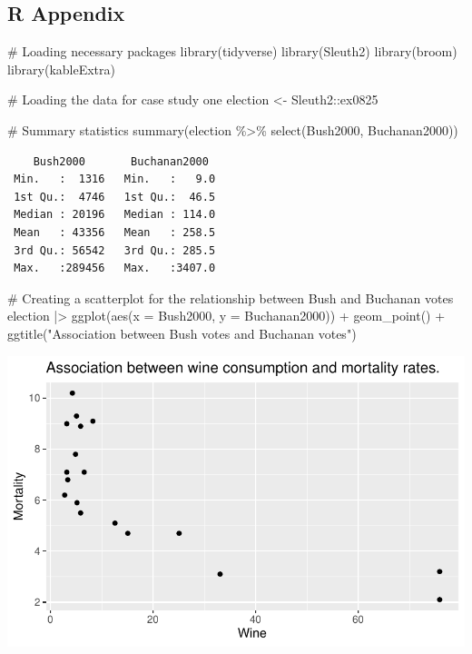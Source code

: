 \documentclass[
  letterpaper,
  DIV=11,
  numbers=noendperiod]{scrartcl}
\newenvironment{Shaded}{\begin{snugshade}}{\end{snugshade}}
\newcommand{\AttributeTok}[1]{\textcolor[rgb]{0.40,0.45,0.13}{#1}}
\newcommand{\CommentTok}[1]{\textcolor[rgb]{0.37,0.37,0.37}{#1}}
\newcommand{\FunctionTok}[1]{\textcolor[rgb]{0.28,0.35,0.67}{#1}}
\newcommand{\NormalTok}[1]{\textcolor[rgb]{0.00,0.23,0.31}{#1}}
\newcommand{\OtherTok}[1]{\textcolor[rgb]{0.00,0.23,0.31}{#1}}
\newcommand{\SpecialCharTok}[1]{\textcolor[rgb]{0.37,0.37,0.37}{#1}}
\newcommand{\StringTok}[1]{\textcolor[rgb]{0.13,0.47,0.30}{#1}}
\begin{document}
\subsection{R Appendix}\label{r-appendix}

\begin{Shaded}
\begin{Highlighting}[]
\CommentTok{\# Loading necessary packages}
\FunctionTok{library}\NormalTok{(tidyverse)}
\FunctionTok{library}\NormalTok{(Sleuth2)}
\FunctionTok{library}\NormalTok{(broom)        }
\FunctionTok{library}\NormalTok{(kableExtra)   }

\CommentTok{\# Loading the data for case study one}
\NormalTok{election }\OtherTok{\textless{}{-}}\NormalTok{ Sleuth2}\SpecialCharTok{::}\NormalTok{ex0825}

\CommentTok{\# Summary statistics}
\FunctionTok{summary}\NormalTok{(election }\SpecialCharTok{\%\textgreater{}\%} \FunctionTok{select}\NormalTok{(Bush2000, Buchanan2000))}
\end{Highlighting}
\end{Shaded}

\begin{verbatim}
    Bush2000       Buchanan2000   
 Min.   :  1316   Min.   :   9.0  
 1st Qu.:  4746   1st Qu.:  46.5  
 Median : 20196   Median : 114.0  
 Mean   : 43356   Mean   : 258.5  
 3rd Qu.: 56542   3rd Qu.: 285.5  
 Max.   :289456   Max.   :3407.0  
\end{verbatim}

\begin{Shaded}
\begin{Highlighting}[]
\CommentTok{\# Creating a scatterplot for the relationship between Bush and Buchanan votes}
\NormalTok{election }\SpecialCharTok{|\textgreater{}}
  \FunctionTok{ggplot}\NormalTok{(}\FunctionTok{aes}\NormalTok{(}\AttributeTok{x =}\NormalTok{ Bush2000,}
             \AttributeTok{y =}\NormalTok{ Buchanan2000)) }\SpecialCharTok{+}
  \FunctionTok{geom\_point}\NormalTok{() }\SpecialCharTok{+}
  \FunctionTok{ggtitle}\NormalTok{(}\StringTok{"Association between Bush votes and Buchanan votes"}\NormalTok{)}
\end{Highlighting}
\end{Shaded}

\includegraphics{SDS-291-case-study-1_files/figure-pdf/unnamed-chunk-4-1.pdf}
\end{document}
